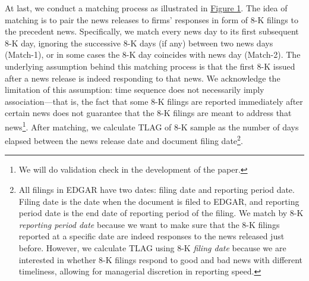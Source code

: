 \documentclass[a4paper]{article}
\begin{document}
\begin{spacing}{2}
At last, we conduct a matching process as illustrated in \hyperref[fig1]{Figure 1}. The idea of matching is to pair the news releases to firms' responses in form of 8-K filings to the precedent news. Specifically, we match every news day to its first subsequent 8-K day, ignoring the successive 8-K days (if any) between two news days (Match-1), or in some cases the 8-K day coincides with news day (Match-2). The underlying assumption behind this matching process is that the first 8-K issued after a news release is indeed responding to that news. We acknowledge the limitation of this assumption: time sequence does not necessarily imply association---that is, the fact that some 8-K filings are reported immediately after certain news does not guarantee that the 8-K filings are meant to address that news\footnote{We will do validation check in the development of the paper.}.
After matching, we calculate TLAG of 8-K sample as the number of days elapsed between the news release date and document filing date\footnote{All filings in EDGAR have two dates: filing date and reporting period date. Filing date is the date when the document is filed to EDGAR, and reporting period date is the end date of reporting period of the filing. We match by 8-K \textit{reporting period date} because we want to make sure that the 8-K filings reported at a specific date are indeed responses to the news released just before. However, we calculate TLAG using 8-K \textit{filing date} because we are interested in whether 8-K filings respond to good and bad news with different timeliness, allowing for managerial discretion in reporting speed.}. 


\end{spacing}
\end{document}
